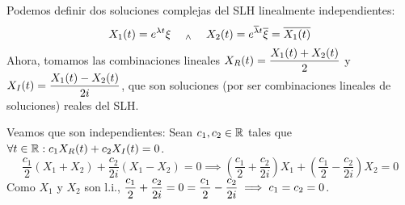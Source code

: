 Podemos definir dos soluciones complejas del SLH linealmente independientes:
\[X_1(t) = e^{\lambda t} \xi \quad \; _{\wedge} \; \quad X_2(t) = e^{\overline{\lambda} t} \overline{\xi} = \overline{X_1(t)}\]
Ahora, tomamos las combinaciones lineales $\displaystyle X_R(t) =\frac{X_1(t) + X_2(t)}{2}$ y $\displaystyle X_I(t) = \frac{X_1(t) - X_2(t)}{2i}$, que son soluciones (por ser combinaciones lineales de soluciones) reales del SLH.

Veamos que son independientes: Sean $c_1, c_2 \in \mathbb{R}$ tales que $\forall t \in \mathbb{R}: c_1 X_R(t) + c_2 X_I(t) = 0$.
\[\frac{c_1}{2} \left(X_1 + X_2\right) + \frac{c_2}{2i} \left(X_1 - X_2\right) = 0 \implies \left(\frac{c_1}{2} + \frac{c_2}{2i}\right)X_1 + \left(\frac{c_1}{2} - \frac{c_2}{2i}\right)X_2 = 0\]
Como $X_1$ y $X_2$ son l.i., $\displaystyle \frac{c_1}{2} + \frac{c_2}{2i} = 0 = \frac{c_1}{2} - \frac{c_2}{2i} \implies c_1 = c_2 = 0$.

